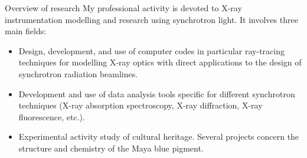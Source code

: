 


\prefix{}
\begin{rubric}{Overview of research}
\entry*[]
    My professional activity is devoted to X-ray instrumentation modelling and research using synchrotron light. It involves three main fields:
    \begin{itemize}
        \item Design, development, and use of computer codes in particular ray-tracing techniques for modelling X-ray optics with direct applications to the design of synchrotron radiation beamlines.
        \item Development and use of data analysis tools 
    specific for different synchrotron techniques (X-ray absorption spectroscopy, X-ray diffraction, X-ray fluorescence, etc.).
        \item Experimental activity study of cultural heritage. Several projects concern the structure and chemistry of the Maya blue pigment.
    \end{itemize}
\end{rubric}